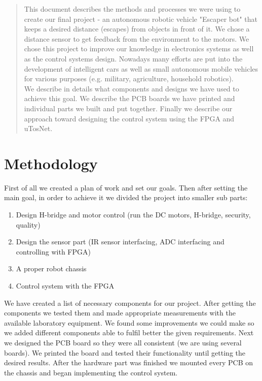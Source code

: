 \label{Abstract}
\begin{abstract}

This document describes the methods and processes we were using to create our final
project - an autonomous robotic vehicle "Escaper bot" that keeps a desired distance (escapes) from objects in front of it. We chose a distance sensor to get feedback from the environment to the motors. We chose this project to improve our knowledge in electronics systems as well as the control systems design. Nowadays many efforts are put into the development of intelligent cars as well as small autonomous mobile vehicles for various purposes (e.g. military, agriculture, household robotics). 
\\
We describe in details what components and designs we have used to achieve this goal. We describe the PCB boards we have printed and individual parts we built and put together. Finally we describe our approach toward designing the control system using the FPGA and uTosNet. 
\end{abstract}

\section{Methodology}
First of all we created a plan of work and set our goals. Then after setting the main goal, in order to achieve it we divided the project into smaller sub parts:

\begin{enumerate}
  \item Design H-bridge and motor control (run the DC motors, H-bridge, security, quality)
  \item Design the sensor part (IR sensor interfacing, ADC interfacing and controlling with FPGA)
  \item A proper robot chassis
  \item Control system with the FPGA
\end{enumerate}

We have created a list of necessary components for our project. After getting the components we tested them and made appropriate measurements with the available laboratory equipment. We found some improvements we could make so we added different components able to fulfil better the given requirements. Next we designed
the PCB board so they were all consistent (we are using several boards). We printed
the board and tested their functionality until getting the desired results. After the hardware part was finished we mounted every PCB on the chassis and began implementing the control system. 

